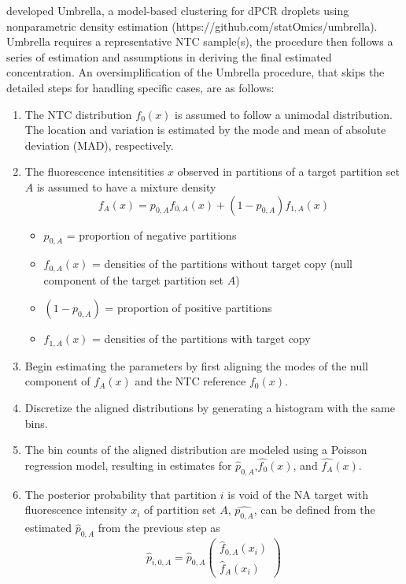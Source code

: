  developed Umbrella, a model-based clustering for dPCR droplets using nonparametric density estimation (https://github.com/statOmics/umbrella). Umbrella requires a representative NTC sample(s), the procedure then follows a series of estimation and assumptions in deriving the final estimated concentration. An oversimplification of the Umbrella procedure, that skips the detailed steps for handling specific cases, are as follows:
\begin{enumerate}
    \item The NTC distribution \(f_0(x)\) is assumed to follow a unimodal distribution. The location and variation is estimated by the mode and mean of absolute deviation (MAD), respectively.
    \item The fluorescence intensitities \(x\) observed in partitions of a target partition set \(A\) is assumed to have a mixture density 
    \[f_A(x) = p_{0,A}f_{0,A}(x) + (1-p_{0,A})f_{1,A}(x)\]
    \begin{itemize}
        \item \(p_{0,A}\) = proportion of negative partitions
        \item \(f_{0,A}(x)\) = densities of the partitions without target copy (null component of the target partition set \(A\))
        \item \((1-p_{0,A})\) = proportion of positive partitions
        \item \(f_{1,A}(x)\) = densities of the partitions with target copy
    \end{itemize}
    \item Begin estimating the parameters by first aligning the modes of  the null component of \(f_A(x)\) and the NTC reference \(f_0(x)\).
    \item Discretize the aligned distributions by generating a histogram with the same bins.
    \item The bin counts of the aligned distribution are modeled using a Poisson regression model, resulting in estimates for \(\hat{p}_{0,A}\),\(\hat{f_{0}}(x)\), and \(\hat{f_{A}}(x)\).
    \item The posterior probability that partition \(i\) is void of the NA target with fluorescence intensity \(x_i\) of partition set \(A\), \(\hat{p_{0,A}}\), can be defined from the estimated \(\hat{p}_{0,A}\) from the previous step as
    \[ \hat{p}_{i,0,A}=\hat{p}_{0,A}\left(\begin{array}{c}\hat{f}_{0,A}(x_i)\\ \hat{f}_{A}(x_i)\end{array}\right) \]

\end{enumerate}
